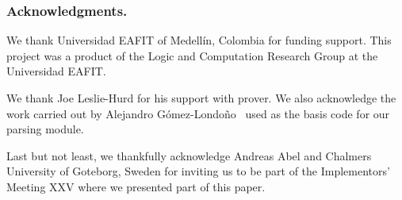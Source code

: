 \documentclass[main.tex]{subfiles}
\begin{document}

\subsubsection*{Acknowledgments.}

We thank Universidad EAFIT of Medell\'in, Colombia for funding
support. This project was a product of the Logic and Computation
Research Group at the Universidad EAFIT.

We thank Joe Leslie-Hurd for his support with \Metis prover. We also
acknowledge the work carried out by Alejandro G\'omez-Londo\~no~
\cite{Gomez-Londono2015} used as the basis code for our \TSTP
parsing module.

Last but not least, we thankfully acknowledge
Andreas Abel and Chalmers University of Goteborg, Sweden for
inviting us to be part of the \Agda Implementors’ Meeting XXV where
we presented part of this paper.
\end{document}
